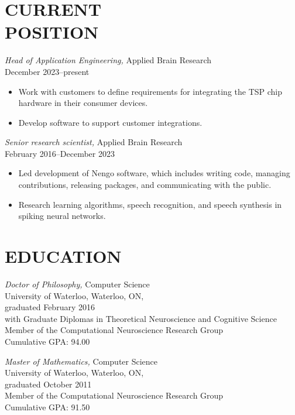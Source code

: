 \documentclass[line,margin]{res}
\begin{document}

\begin{resume}

\section{CURRENT \\ POSITION}

{\sl Head of Application Engineering,} Applied Brain Research \\
December 2023--present
\begin{itemize} \itemsep -2pt
  \item Work with customers to define requirements for integrating
    the TSP chip hardware in their consumer devices.
  \item Develop software to support customer integrations.
\end{itemize} \vspace{-4pt}

{\sl Senior research scientist,} Applied Brain Research \\
February 2016--December 2023
\begin{itemize} \itemsep -2pt
  \item Led development of Nengo software, which includes
    writing code, managing contributions,
    releasing packages, and communicating with the public.
  \item Research learning algorithms,
    speech recognition, and speech synthesis
    in spiking neural networks.
\end{itemize} \vspace{-4pt}

\section{EDUCATION}

{\sl Doctor of Philosophy,} Computer Science \\
University of Waterloo, Waterloo, ON, \\
graduated February 2016 \\
with Graduate Diplomas in Theoretical Neuroscience and Cognitive Science \\
Member of the Computational Neuroscience Research Group \\
Cumulative GPA: 94.00

{\sl Master of Mathematics,} Computer Science \\
University of Waterloo, Waterloo, ON, \\
graduated October 2011 \\
Member of the Computational Neuroscience Research Group \\
Cumulative GPA: 91.50


\end{resume}
\end{document}
